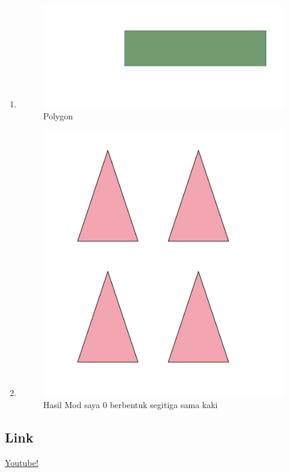 \begin{enumerate}
	\item 
	
	\begin{figure}[H]
		\includegraphics[width=12cm]{figures/1174056/9.PNG}
		\centering
		\caption{Polygon}
	\end{figure}
	
	\item 
	
	\begin{figure}[H]
		\includegraphics[width=12cm]{figures/1174056/10.PNG}
		\centering
		\caption{Hasil Mod saya 0 berbentuk segitiga sama kaki}
	\end{figure}	
\end{enumerate}

\subsection{Link}
\href{https://youtu.be/5X5gnr74VV4}{Youtube!}